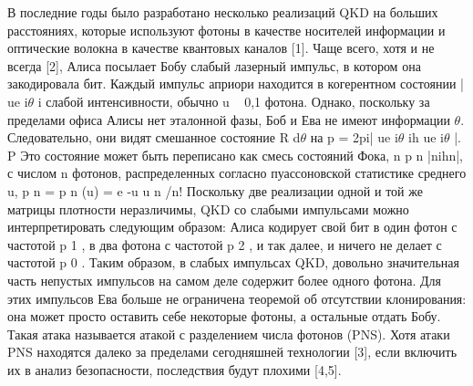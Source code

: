В последние годы было разработано несколько реализаций QKD на больших расстояниях, которые используют фотоны в качестве носителей информации и оптические волокна в качестве квантовых каналов [1]. Чаще всего, хотя и не всегда [2], Алиса посылает Бобу слабый лазерный импульс, в котором она закодировала бит. Каждый импульс априори находится в когерентном состоянии | ue i$\theta$ i слабой интенсивности, обычно u ~ 0,1 фотона. Однако, поскольку за пределами офиса Алисы нет эталонной фазы, Боб и Ева не имеют информации $\theta$. Следовательно, они видят смешанное состояние R d$\theta$ на p = 2pi| ue i$\theta$ ih ue i$\theta$ |. P Это состояние может быть переписано как смесь состояний Фока, n p n |nihn|, с числом n фотонов, распределенных согласно пуассоновской статистике среднего u, p n = p n (u) = e -u u n /n! Поскольку две реализации одной и той же матрицы плотности неразличимы, QKD со слабыми импульсами можно интерпретировать следующим образом: Алиса кодирует свой бит в один фотон с частотой p 1 , в два фотона с частотой p 2 , и так далее, и ничего не делает с частотой p 0 . Таким образом, в слабых импульсах QKD, довольно значительная часть непустых импульсов на самом деле содержит более одного фотона. Для этих импульсов Ева больше не ограничена теоремой об отсутствии клонирования: она может просто оставить себе некоторые фотоны, а остальные отдать Бобу. Такая атака называется атакой с разделением числа фотонов (PNS). Хотя атаки PNS находятся далеко за пределами сегодняшней технологии [3], если включить их в анализ безопасности, последствия будут плохими [4,5].

